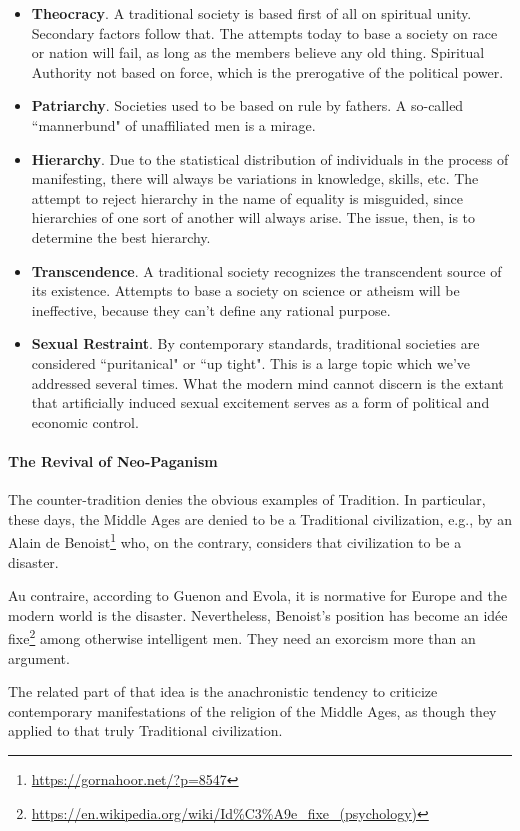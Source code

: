 \begin{itemize}
\item \textbf{Theocracy}. A traditional society is based first of all on spiritual unity. Secondary factors follow that. The attempts today to base a society on race or nation will fail, as long as the members believe any old thing. Spiritual Authority not based on force, which is the prerogative of the political power. 
\item \textbf{Patriarchy}. Societies used to be based on rule by fathers. A so-called ``mannerbund" of unaffiliated men is a mirage. 
\item \textbf{Hierarchy}. Due to the statistical distribution of individuals in the process of manifesting, there will always be variations in knowledge, skills, etc. The attempt to reject hierarchy in the name of equality is misguided, since hierarchies of one sort of another will always arise. The issue, then, is to determine the best hierarchy. 
\item \textbf{Transcendence}. A traditional society recognizes the transcendent source of its existence. Attempts to base a society on science or atheism will be ineffective, because they can't define any rational purpose. 
\item \textbf{Sexual Restraint}. By contemporary standards, traditional societies are considered ``puritanical" or ``up tight". This is a large topic which we've addressed several times. What the modern mind cannot discern is the extant that artificially induced sexual excitement serves as a form of political and economic control. 
\end{itemize}
\paragraph{The Revival of Neo-Paganism}
The counter-tradition denies the obvious examples of Tradition. In particular, these days, the Middle Ages are denied to be a Traditional civilization, e.g., by an Alain de Benoist\footnote{\url{https://gornahoor.net/?p=8547}} who, on the contrary, considers that civilization to be a disaster.

Au contraire, according to Guenon and Evola, it is normative for Europe and the modern world is the disaster. Nevertheless, Benoist's position has become an idée fixe\footnote{\url{https://en.wikipedia.org/wiki/Id\%C3\%A9e_fixe_(psychology)}} among otherwise intelligent men. They need an exorcism more than an argument.

The related part of that idea is the anachronistic tendency to criticize contemporary manifestations of the religion of the Middle Ages, as though they applied to that truly Traditional civilization.

